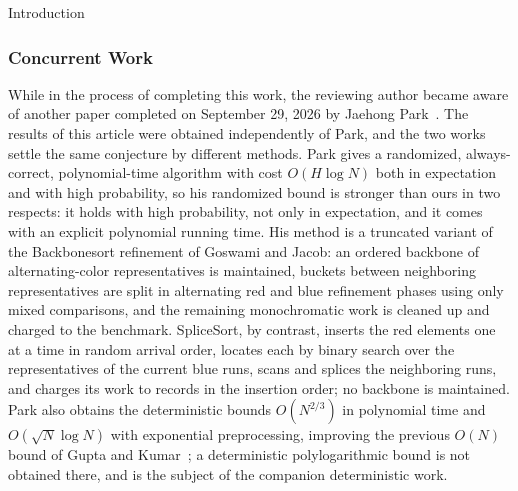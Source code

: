 \documentclass[11pt]{article}
\theoremstyle{definition}
\numberwithin{equation}{section}
\begin{document}
\begin{section}{Introduction}
\begin{humanblock}
\section*{Concurrent Work}
While in the process of completing this work, the reviewing author became aware of another paper completed on September 29, 2026 by Jaehong Park~\cite{park2026bichromatic}. The results of this article were obtained independently of Park, and the two works settle the same conjecture by different methods. Park gives a randomized, always-correct, polynomial-time algorithm with cost $O(H \log N)$ both in expectation and with high probability, so his randomized bound is stronger than ours in two respects: it holds with high probability, not only in expectation, and it comes with an explicit polynomial running time. His method is a truncated variant of the {\ttfamily Backbonesort} refinement of Goswami and Jacob: an ordered backbone of alternating-color representatives is maintained, buckets between neighboring representatives are split in alternating red and blue refinement phases using only mixed comparisons, and the remaining monochromatic work is cleaned up and charged to the benchmark. {\ttfamily SpliceSort}, by contrast, inserts the red elements one at a time in random arrival order, locates each by binary search over the representatives of the current blue runs, scans and splices the neighboring runs, and charges its work to records in the insertion order; no backbone is maintained. Park also obtains the deterministic bounds $O(N^{2/3})$ in polynomial time and $O(\sqrt N \log N)$ with exponential preprocessing, improving the previous $O(N)$ bound of Gupta and Kumar~\cite{gupta2001sorting}; a deterministic polylogarithmic bound is not obtained there, and is the subject of the companion deterministic work.
\end{humanblock}

\end{section}

\end{document}
